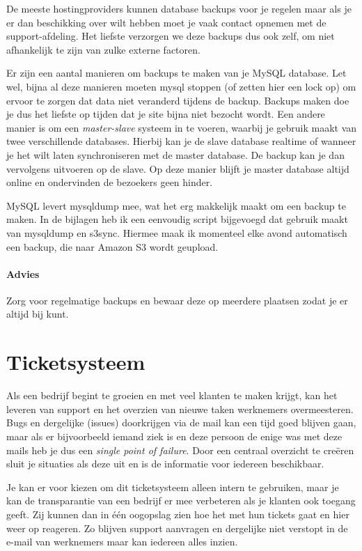 De meeste hostingproviders kunnen database backups voor je regelen maar als je er dan beschikking over wilt hebben moet je vaak contact opnemen met de support-afdeling. Het liefste verzorgen we deze backups dus ook zelf, om niet afhankelijk te zijn van zulke externe factoren.

Er zijn een aantal manieren om backups te maken van je MySQL database. Let wel, bijna al deze manieren moeten mysql stoppen (of zetten hier een lock op) om ervoor te zorgen dat data niet veranderd tijdens de backup. Backups maken doe je dus het liefste op tijden dat je site bijna niet bezocht wordt. Een andere manier is om een \emph{master-slave} systeem in te voeren, waarbij je gebruik maakt van twee verschillende databases. Hierbij kan je de slave database realtime of wanneer je het wilt laten synchroniseren met de master database. De backup kan je dan vervolgens uitvoeren op de slave. Op deze manier blijft je master database altijd online en ondervinden de bezoekers geen hinder.

MySQL levert mysqldump mee, wat het erg makkelijk maakt om een backup te maken. In de bijlagen heb ik een eenvoudig script bijgevoegd dat gebruik maakt van mysqldump en s3sync. Hiermee maak ik momenteel elke avond automatisch een backup, die naar Amazon S3 wordt geupload.

\paragraph{Advies} Zorg voor regelmatige backups en bewaar deze op meerdere plaatsen zodat je er altijd bij kunt.

\section{Ticketsysteem}

Als een bedrijf begint te groeien en met veel klanten te maken krijgt, kan het leveren van support en het overzien van nieuwe taken werknemers overmeesteren. Bugs en dergelijke (issues) doorkrijgen via de mail kan een tijd goed blijven gaan, maar als er bijvoorbeeld iemand ziek is en deze persoon de enige was met deze mails heb je dus een \emph{single point of failure}. Door een centraal overzicht te creëren sluit je situaties als deze uit en is de informatie voor iedereen beschikbaar.

Je kan er voor kiezen om dit ticketsysteem alleen intern te gebruiken, maar je kan de transparantie van een bedrijf er mee verbeteren als je klanten ook toegang geeft. Zij kunnen dan in één oogopslag zien hoe het met hun tickets gaat en hier weer op reageren. Zo blijven support aanvragen en dergelijke niet verstopt in de e-mail van werknemers maar kan iedereen alles inzien. 

